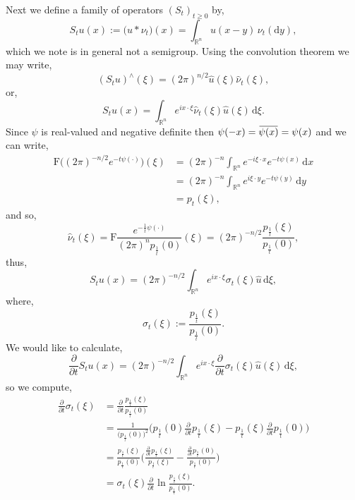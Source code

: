 \documentclass[a4paper, 12pt]{report}
\theoremstyle{remark}
\theoremstyle{definition}
\newcommand{\overbar}[1]{\mkern 1.5mu\overline{\mkern-1.5mu#1\mkern-1.5mu}\mkern 1.5mu}
\begin{document}
Next we define a family of operators $(S_t)_{t \ge 0}$ by,
\begin{equation}
S_tu(x) := \big(u \ast \nu_t\big)(x) = \int_{\mathbb{R}^n}u(x - y)\,\nu_t(\mathrm{d}y),
\end{equation}
which we note is in general not a semigroup.  Using the convolution theorem we may write,
$$
(S_tu)^\wedge(\xi) = (2\pi)^{n/2}\hat{u}(\xi)\hat{\nu}_t(\xi),
$$
or,
$$
S_tu(x) = \int_{\mathbb{R}^n}e^{ix\cdot\xi}\hat{\nu}_t(\xi)\hat{u}(\xi)\,\mathrm{d}\xi.
$$
Since $\psi$ is real-valued and negative definite then $\psi(-x) = \overbar{\psi(x)} = \psi(x)$ and we can write,
$$
\begin{aligned}
\mathrm{F}\big((2\pi)^{-n/2}e^{-t\psi(\cdot)}\big)(\xi) & = (2\pi)^{-n}\int_{\mathbb{R}^n}e^{-i\xi\cdot x}e^{-t\psi(x)}\,\mathrm{d}x\\
& = (2\pi)^{-n}\int_{\mathbb{R}^n}e^{i\xi\cdot y}e^{-t\psi(y)}\,\mathrm{d}y\\
& = p_t(\xi),
\end{aligned}
$$
and so,
$$
\hat{\nu}_t(\xi) = \mathrm{F}\frac{e^{-\frac{1}{t}\psi(\cdot)}}{(2\pi)^np_\frac{1}{t}(0)}(\xi) = (2\pi)^{-n/2}\frac{p_\frac{1}{t}(\xi)}{p_\frac{1}{t}(0)},
$$
thus,
\begin{equation}
S_tu(x) = (2\pi)^{-n/2}\int_{\mathbb{R}^n}e^{ix\cdot\xi}\sigma_t(\xi)\hat{u}\,\mathrm{d}\xi,
\end{equation}
where,
\begin{equation}
\sigma_t(\xi) := \frac{p_\frac{1}{t}(\xi)}{p_\frac{1}{t}(0)}.
\end{equation}
We would like to calculate,
$$
\frac{\partial}{\partial t}S_tu(x) = (2\pi)^{-n/2}\int_{\mathbb{R}^n}e^{ix\cdot\xi}\frac{\partial}{\partial t}\sigma_t(\xi)\hat{u}(\xi)\,\mathrm{d}\xi,
$$
so we compute,
$$
\begin{aligned}
\frac{\partial}{\partial t}\sigma_t(\xi) & = \frac{\partial}{\partial t}\frac{p_\frac{1}{t}(\xi)}{p_\frac{1}{t}(0)}\\
& = \frac{1}{\big(p_\frac{1}{t}(0)\big)^2}\bigg(p_\frac{1}{t}(0)\frac{\partial}{\partial t}p_\frac{1}{t}(\xi) - p_\frac{1}{t}(\xi)\frac{\partial}{\partial t}p_\frac{1}{t}(0)\bigg)\\
& = \frac{p_\frac{1}{t}(\xi)}{p_\frac{1}{t}(0)}\bigg(\frac{\frac{\partial}{\partial t}p_\frac{1}{t}(\xi)}{p_\frac{1}{t}(\xi)} - \frac{\frac{\partial}{\partial t}p_\frac{1}{t}(0)}{p_\frac{1}{t}(0)}\bigg)\\
& = \sigma_t(\xi)\frac{\partial}{\partial t}\ln\frac{p_\frac{1}{t}(\xi)}{p_\frac{1}{t}(0)}.
\end{aligned}
$$
\end{document}
